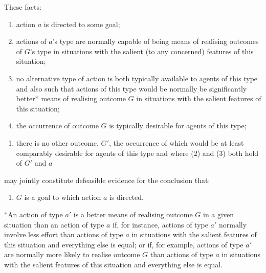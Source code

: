 \documentclass[11pt]{extarticle}
\begin{document}
\begin{multicols}{3}
These facts:
%
\begin{enumerate}
%
\item action $a$ is directed to some goal;
%
\item actions of $a$'s type are normally capable of being means of realising outcomes of $G$'s type in situations with the salient (to any concerned) features of this situation;
% 
\item no alternative type of action is both 
typically available to agents of this type 
and also 
such that actions of this type would be normally be significantly better* means of realising outcome $G$ in situations with the salient features of this situation;
%
\item the occurrence of outcome $G$ is typically desirable for agents of this type;
%
\end{enumerate}
%
\begin{enumerate}[resume]
\item there is no other outcome, $G'$, 
the occurrence of which would be at least comparably desirable for agents of this type 
and where (2) and (3) both hold of $G'$ and $a$
%
\end{enumerate}
%
may jointly constitute defeasible evidence for the conclusion that:
%
\begin{enumerate}[resume]
\item $G$ is a goal to which action $a$ is directed.
\end{enumerate}
%

{
\footnotesize
*An action of type $a'$ is a better means of realising outcome $G$ in a given situation than an action of type $a$ if, for instance, actions of type $a'$ normally involve less effort than actions of type $a$ 
in situations with the salient features of this situation 
and everything else is equal; 
or if, for example, actions of type $a'$ are normally more likely to realise outcome $G$ than actions of type $a$
in situations with the salient features of this situation 
and everything else is equal.
}



\end{multicols}
\end{document}
